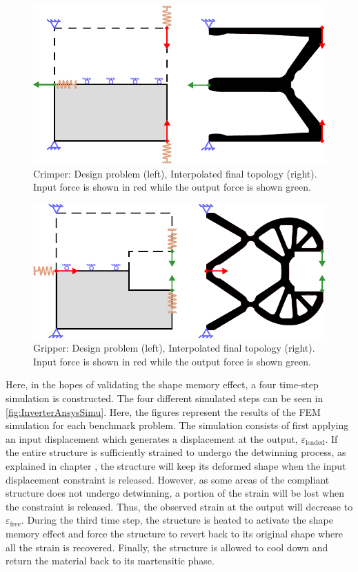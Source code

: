 \begin{figure}[hbt!]
    \centering
    \includegraphics[width=0.65\columnwidth]{images/chap5/Crimper_Schematic_FinalCAD.pdf}
    \caption{Crimper: Design problem (left), Interpolated final topology (right). Input force is shown in red while the output force is shown green.}
    \label{fig:Crimper_ProbFinal}
\end{figure}
\begin{figure}[hbt!]
    \centering
    \includegraphics[width=0.65\columnwidth]{images/chap5/Gripper_Schematic_FinalCAD.pdf}
    \caption{Gripper: Design problem (left), Interpolated final topology (right). Input force is shown in red while the output force is shown green.}
    \label{fig:Gripper_ProbFinal}
\end{figure}

Here, in the hopes of validating the shape memory effect, a four time-step simulation is constructed. The four different simulated steps can be seen in \cref{fig:InverterAnsysSimu}. Here, the figures represent the results of the FEM simulation for each benchmark problem. The simulation consists of first applying an input displacement which generates a displacement at the output, $\varepsilon_\text{loaded}$. If the entire structure is sufficiently strained to undergo the detwinning process, as explained in chapter \todocite, the structure will keep its deformed shape when the input displacement constraint is released. However, as some areas of the compliant structure does not undergo detwinning, a portion of the strain will be lost when the constraint is released. Thus, the observed strain at the output will decrease to $\varepsilon_\text{free}$. During the third time step, the structure is heated to activate the shape memory effect and force the structure to revert back to its original shape where all the strain is recovered. Finally, the structure is allowed to cool down and return the material back to its martensitic phase.

